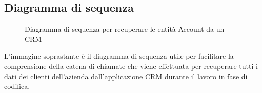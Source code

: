 \subsection{Diagramma di sequenza}
	\begin{figure}[H]
	\centering
	
	\caption{Diagramma di sequenza per recuperare le entità Account da un \gls{CRM} }
	\label{fig:sdProposals}
\end{figure}

L'immagine soprastante è il diagramma di sequenza utile per facilitare la comprensione della catena di chiamate che viene effettuata per recuperare tutti i dati dei clienti dell'azienda dall'applicazione \gls{CRM} durante il lavoro in fase di codifica.

